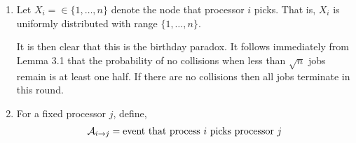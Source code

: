\documentclass[10pt]{article}
\begin{document}
\begin{solution}[Solution]
\begin{enumerate}[label=(\alph*)]
\item 
    Let \( X_i = \in \{1,\ldots,n\} \) denote the node that processor \( i \) picks. That is, \( X_i \) is uniformly distributed with range \( \{1,\ldots, n\} \).
    
    It is then clear that this is the birthday paradox. It follows immediately from Lemma 3.1 that the probability of no collisions when less than \( \sqrt{n} \) jobs remain is at least one half. If there are no collisions then all jobs terminate in this round. 




    \iffalse

    We compute the probability of no jobs picking the same processor. Denote this probability by \( p(n) \).

    The probability that processor \( i \) picks an empty node given that all previous processes have picked empty nodes is \( (n-(i-1)) / n \).

    Therefore,
    \begin{align*}
        p(n)
        = \prod_{i=1}^{\sqrt{n}} \left( \frac{n-(i-1)}{n} \right)
        = \prod_{i=0}^{\sqrt{n}-1} \left( 1 - \frac{i}{n} \right)
        = 1 - \sum_{i=0}^{\sqrt{n}-1} \frac{i}{n} + \cO\left(\frac{1}{\sqrt{n}}\right)
    \end{align*}

    \textbf{justfy this epxansion?}

    Now note that, 
    \begin{align*}
        \sum_{i=0}^{\sqrt{n}-1} \frac{i}{n} 
        = \frac{1+\sqrt{n}}{2+\sqrt{n}}
    \end{align*}

        It is then clear that \( p(n) \to 1/2 \) as \( n\to\infty \). Since \( n\in\NN \), for any \( \epsilon > 0 \), and in particular for \( \epsilon \in (0,1/2) \), there can only be finitely many \( n \) such that \( |p(n)-1/2| > \epsilon \).
        Moreover, for each of these \( n \), \( p(n) > 0 \). Therefore, \( c := \inf_n p(n) = \min_n p(n) > 0 \) gives a strictly positive lower bound on \( p(n) \) independent of \( n \).
    \fi

\item  
    For a fixed processor \( j \), define,
    \begin{align*}
        \mathcal{A}_{i\to j} = \text{event that process \( i \) picks processor \( j \)}
    \end{align*}
    

\end{enumerate}
\end{solution}
\end{document}
